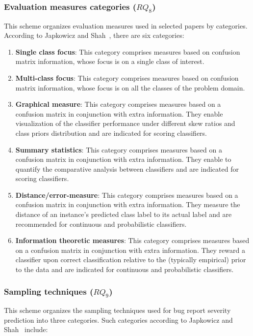 \subsubsection{Evaluation measures categories ($RQ_8$)}
This scheme organizes evaluation measures used in selected papers by categories. According to Japkowicz and Shah~\cite{Japkowicz:2011},
there are six categories:  

\begin{enumerate}[label=\alph*., leftmargin=1.2cm]
  \item \textbf{Single class focus}: This category comprises measures based on confusion matrix information, whose focus is on a single class of interest.
  \item \textbf{Multi-class focus}: This category comprises measures based on confusion matrix information, whose focus is on all the classes of the problem domain.
  \item \textbf{Graphical measure}: This category comprises measures based on a confusion matrix in conjunction with extra information. They enable visualization of the classifier performance under different skew ratios and class priors distribution and are indicated for scoring classifiers.
  \item \textbf{Summary statistics}: This category comprises measures based on a confusion matrix in conjunction with extra information. They enable to quantify the comparative analysis between classifiers and are indicated for scoring classifiers.
  \item \textbf{Distance/error-measure}: This category comprises measures based on a confusion matrix in conjunction with extra information. They measure the distance of an instance's predicted class label to its actual label and are recommended for continuous and probabilistic classifiers.
  \item \textbf{Information theoretic measures}: This category comprises measures based on a confusion matrix in conjunction with extra information. They reward a classifier upon correct classification relative to the (typically empirical) prior to the data and are indicated for continuous and probabilistic classifiers.
\end{enumerate}

\subsubsection{Sampling techniques ($RQ_9$)}
This scheme organizes the sampling techniques used for bug report severity prediction into three categories. Such categories according to Japkowicz and Shah~\cite{Japkowicz:2011} include:

